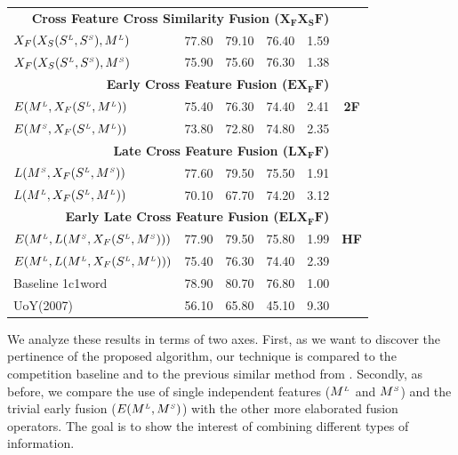 \begin{table}[htp!]
\begin{tabular}{@{}lrrrrc@{}}
 \midrule
       \multicolumn{5}{r}{\textbf{Cross Feature Cross Similarity Fusion ($\mathbf{X_FX_SF}$)}}   & \multirow{9}{*}{\textbf{2F}}    \\ %

       $X_F(X_S(S^{\scriptscriptstyle L}, S^{\scriptscriptstyle S}), M^{\scriptscriptstyle L})$		&	77.80	&79.10  & 76.40& 1.59 \\	   
       $X_F(X_S(S^{\scriptscriptstyle L}, S^{\scriptscriptstyle S}), M^{\scriptscriptstyle S})$		&	75.90	& 75.60 & 76.30 & 1.38 \\	   
       \multicolumn{5}{r}{\textbf{Early Cross Feature Fusion ($\mathbf{EX_FF}$)}}       \\ %
       
       $E(M^{\scriptscriptstyle L}, X_F(S^{\scriptscriptstyle L}, M^{\scriptscriptstyle L}))$		&	75.40	& 76.30  & 74.40 & 2.41 \\	   
	   $E(M^{\scriptscriptstyle S}, X_F(S^{\scriptscriptstyle L}, M^{\scriptscriptstyle L}))$		&	73.80	& 72.80  & 74.80 & 2.35 \\	   
       \multicolumn{5}{r}{\textbf{Late Cross Feature Fusion ($\mathbf{LX_FF}$)}}       \\ %
	   $L(M^{\scriptscriptstyle S}, X_F(S^{\scriptscriptstyle L}, M^{\scriptscriptstyle S}))$		&	77.60	& 79.50	 & 75.50 & 1.91 \\	   
	   $L(M^{\scriptscriptstyle L}, X_F(S^{\scriptscriptstyle L}, M^{\scriptscriptstyle L}))$		&	70.10	& 67.70 & 74.20 & 3.12 \\	   
       \midrule
       \multicolumn{5}{r}{\textbf{Early Late Cross Feature Fusion ($\mathbf{ELX_FF	}$)}}    & \multirow{3}{*}{\textbf{HF}}   \\ %
	   $E(M^{\scriptscriptstyle L}, L(M^{\scriptscriptstyle S}, X_F(S^{\scriptscriptstyle L}, M^{\scriptscriptstyle S})))$		&	77.90	& 79.50 & 75.80& 1.99 \\	   
	   $E(M^{\scriptscriptstyle L}, L(M^{\scriptscriptstyle L}, X_F(S^{\scriptscriptstyle L}, M^{\scriptscriptstyle L})))$		&	75.40	& 76.30&74.40 & 2.39 \\
	   \midrule
	   \midrule
	   Baseline 1c1word 		&	78.90	& 80.70&76.80 & 1.00 \\ 	   	 	    	   
	   UoY(2007)	&	56.10	& 65.80 &45.10 & 9.30 \\ 	 

		   
       \bottomrule
\end{tabular}
\end{table}

We analyze these results in terms of two  axes. First, as we want to discover the pertinence of the proposed algorithm,  our technique is compared to the competition baseline and to the previous similar method from \cite{2007.Klapaftis.UOY}. Secondly, as before, we compare the use of single independent features ($M^{\scriptscriptstyle L}$ and $M^{\scriptscriptstyle S}$) and the trivial early fusion ($E(M^{\scriptscriptstyle L}, M^{\scriptscriptstyle S})$) with the other more elaborated fusion operators. The goal is to show the interest of combining different types of information.


